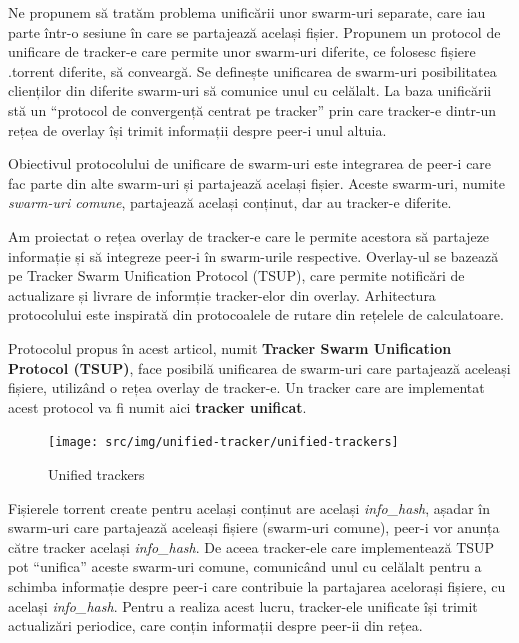 Ne propunem să tratăm problema unificării unor swarm-uri separate, care iau parte într-o sesiune în care se partajează același fișier. Propunem un protocol de unificare de tracker-e care permite unor swarm-uri diferite, ce folosesc fișiere .torrent diferite, să conveargă. Se definește unificarea de swarm-uri posibilitatea clienților din diferite swarm-uri să comunice unul cu celălalt. La baza unificării stă un ``protocol de convergență centrat pe tracker'' prin care tracker-e dintr-un rețea de overlay își trimit informații despre peer-i unul altuia.

Obiectivul protocolului de unificare de swarm-uri este integrarea de peer-i care fac parte din alte swarm-uri și partajează același fișier. Aceste swarm-uri, numite \textit{swarm-uri comune}, partajează același conținut, dar au tracker-e diferite.

Am proiectat o rețea overlay de tracker-e care le permite acestora să partajeze informație și să integreze peer-i în swarm-urile respective. Overlay-ul se bazează pe Tracker Swarm Unification Protocol (TSUP), care permite notificări de actualizare și livrare de informție tracker-elor din overlay. Arhitectura protocolului este inspirată din protocoalele de rutare din rețelele de calculatoare.

Protocolul propus în acest articol, numit \textbf{Tracker Swarm Unification Protocol (TSUP)}, face posibilă unificarea de swarm-uri care partajează aceleași fișiere, utilizând o rețea overlay de tracker-e. Un tracker care are implementat acest protocol va fi numit aici \textbf{tracker unificat}.

\begin{figure}[h]
  \begin{center}
    \texttt{[image: src/img/unified-tracker/unified-trackers]}
  \end{center}
  \caption{Unified trackers}
  \label{fig:unified-tracker:unified-trackers}
\end{figure}

Fișierele torrent create pentru același conținut are același \textit{info_hash}, așadar în swarm-uri care partajează aceleași fișiere (swarm-uri comune), peer-i vor anunța către tracker același \textit{info_hash}. De aceea tracker-ele care implementează TSUP pot ``unifica'' aceste swarm-uri comune, comunicând unul cu celălalt pentru a schimba informație despre peer-i care contribuie la partajarea acelorași fișiere, cu același \textit{info_hash}. Pentru a realiza acest lucru, tracker-ele unificate își trimit actualizări periodice, care conțin informații despre peer-ii din rețea.

